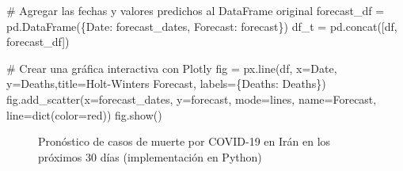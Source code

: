 \documentclass[
  us-letterpaper,
]{scrreprt}
\newenvironment{Shaded}{\begin{snugshade}}{\end{snugshade}}
\newcommand{\BuiltInTok}[1]{\textcolor[rgb]{0.00,0.23,0.31}{#1}}
\newcommand{\CommentTok}[1]{\textcolor[rgb]{0.37,0.37,0.37}{#1}}
\newcommand{\NormalTok}[1]{\textcolor[rgb]{0.00,0.23,0.31}{#1}}
\newcommand{\OperatorTok}[1]{\textcolor[rgb]{0.37,0.37,0.37}{#1}}
\newcommand{\StringTok}[1]{\textcolor[rgb]{0.13,0.47,0.30}{#1}}
\theoremstyle{definition}
\theoremstyle{plain}
\theoremstyle{plain}
\theoremstyle{definition}
\theoremstyle{remark}
\begin{document}
\begin{tcolorbox}
\begin{Shaded}
\begin{Highlighting}[]
\CommentTok{\# Agregar las fechas y valores predichos al DataFrame original}
\NormalTok{forecast\_df }\OperatorTok{=}\NormalTok{ pd.DataFrame(\{}\StringTok{\textquotesingle{}Date\textquotesingle{}}\NormalTok{: forecast\_dates, }
\StringTok{\textquotesingle{}Forecast\textquotesingle{}}\NormalTok{: forecast\})}
\NormalTok{df\_t }\OperatorTok{=}\NormalTok{ pd.concat([df, forecast\_df])}

\CommentTok{\# Crear una gráfica interactiva con Plotly}
\NormalTok{fig }\OperatorTok{=}\NormalTok{ px.line(df, x}\OperatorTok{=}\StringTok{\textquotesingle{}Date\textquotesingle{}}\NormalTok{, y}\OperatorTok{=}\StringTok{\textquotesingle{}Deaths\textquotesingle{}}\NormalTok{,title}\OperatorTok{=}\StringTok{\textquotesingle{}Holt{-}Winters Forecast\textquotesingle{}}\NormalTok{, }
\NormalTok{labels}\OperatorTok{=}\NormalTok{\{}\StringTok{\textquotesingle{}Deaths\textquotesingle{}}\NormalTok{: }\StringTok{\textquotesingle{}Deaths\textquotesingle{}}\NormalTok{\})}
\NormalTok{fig.add\_scatter(x}\OperatorTok{=}\NormalTok{forecast\_dates, y}\OperatorTok{=}\NormalTok{forecast, mode}\OperatorTok{=}\StringTok{\textquotesingle{}lines\textquotesingle{}}\NormalTok{, }
\NormalTok{name}\OperatorTok{=}\StringTok{\textquotesingle{}Forecast\textquotesingle{}}\NormalTok{, line}\OperatorTok{=}\BuiltInTok{dict}\NormalTok{(color}\OperatorTok{=}\StringTok{\textquotesingle{}red\textquotesingle{}}\NormalTok{))}
\NormalTok{fig.show()}
\end{Highlighting}
\end{Shaded}

\end{tcolorbox}

\begin{figure}


\caption{\label{fig-hwf1}Pronóstico de casos de muerte por COVID-19 en
Irán en los próximos 30 días (implementación en Python)}

\end{figure}%
\end{document}

